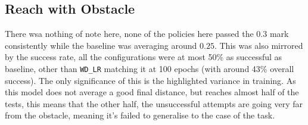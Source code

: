 \subsection{Reach with Obstacle}
There wsa nothing of note here, none of the policies here passed the $0.3$ mark consistently while the baseline was averaging around $0.25$. This was also mirrored by the success rate, all the configurations were at most 50\% as successful as baseline, other than \verb|WD_LR| matching it at 100 epochs (with around 43\% overall success). The only significance of this is the highlighted variance in training. As this model does not average a good final distance, but reaches almost half of the tests, this means that the other half, the unsuccessful attempts are going very far from the obstacle, meaning it's failed to generalise to the case of the task.